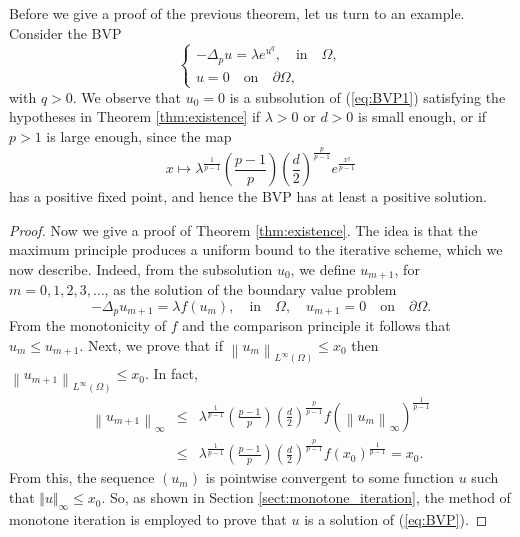 \documentclass[11pt]{amsart}
\theoremstyle{definition}
\begin{document}
Before we give a proof of the previous theorem, let us turn to an example.
Consider the BVP
\begin{equation}
    \label{eq:BVP1}
        \left\{
        \begin{array}{l}
        -\Delta_p u = \lambda e^{u^q}, \quad \mbox{in} \quad \Omega,\\
        u=0 \quad \mbox{on} \quad \partial \Omega,
        \end{array}
        \right.
    \end{equation}
    with $q>0$. We observe that $u_0=0$ is a subsolution of (\ref{eq:BVP1}) satisfying the hypotheses in Theorem \ref{thm:existence} if $\lambda>0$ or
    $d>0$ is small enough, or if $p>1$ is large enough, since the map 
    \[
    x\mapsto \lambda^{\frac{1}{p-1}} \left(\frac{p-1}{p}\right)
\left(\frac{d}{2}\right)^{\frac{p}{p-1}}e^{\frac{x^q}{p-1}}
    \]
    has a positive fixed point, and hence the BVP has at least a positive solution.
\begin{proof}
    Now we give a proof of Theorem \ref{thm:existence}. The idea is that the maximum principle produces a uniform bound to the iterative scheme, which we now describe. Indeed,  from the subsolution $u_0$, we define $u_{m+1}$, for $m=0,1,2,3,\dots$, as the solution of the boundary
    value problem
    \[
     -\Delta_p u_{m+1}=\lambda f\left(u_m\right),
     \quad \mbox{in} \quad \Omega, \quad u_{m+1}=0
     \quad \mbox{on}\quad \partial\Omega.
    \]
    From the monotonicity of $f$ and the comparison principle it
    follows that $u_{m}\leq u_{m+1}$. Next, we prove 
    that if $\left\|u_m\right\|_{L^{\infty}\left(\Omega\right)}\leq x_0$ then $\left\|u_{m+1}\right\|_{L^{\infty}\left(\Omega\right)}\leq x_0$.
    In fact,
    \begin{eqnarray*}
        \left\|u_{m+1}\right\|_{\infty}&\leq& 
     \lambda^{\frac{1}{p-1}} \left(\frac{p-1}{p}\right)
\left(\frac{d}{2}\right)^{\frac{p}{p-1}} f\left(\left\|u_m\right\|_{\infty}\right)^{\frac{1}{p-1}}\\
        &\leq&\lambda^{\frac{1}{p-1}}\left(\frac{p-1}{p}\right)
\left(\frac{d}{2}\right)^{\frac{p}{p-1}} f\left(x_0\right)^{\frac{1}{p-1}}=x_0.
    \end{eqnarray*}
    From this, the sequence $(u_m)$ is pointwise convergent to some function $u$ such that $\Vert u\Vert_\infty\leq x_0$. So, as shown in Section \ref{sect:monotone_iteration}, the method of monotone iteration is employed to prove that $u$ is a solution of (\ref{eq:BVP}).
\end{proof}
\end{document}
